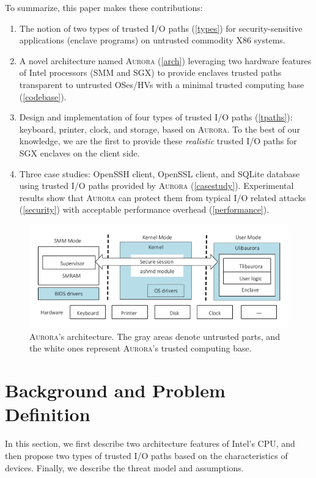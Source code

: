 To summarize, this paper makes these contributions:
\begin{enumerate}[]
\item The notion of two types of trusted I/O paths (\autoref{types}) for security-sensitive applications (enclave programs) on untrusted commodity X86 systems.
\item A novel architecture named \textsc{Aurora} (\autoref{arch}) leveraging two hardware features of Intel processors (SMM and SGX) to provide enclaves trusted paths transparent to untrusted OSes/HVs with a minimal trusted computing base (\autoref{codebase}).
\item Design and implementation of four types of trusted I/O paths (\autoref{tpaths}): keyboard, printer, clock, and storage, based on \textsc{Aurora}.  To the best of our knowledge, we are the first to provide these \emph{realistic} trusted I/O paths for SGX enclaves on the client side.
\item Three case studies: OpenSSH client, OpenSSL client, and SQLite database using trusted I/O paths provided by \textsc{Aurora} (\autoref{casestudy}). Experimental results show that \textsc{Aurora} can protect them from typical I/O related attacks (\autoref{security}) with acceptable performance overhead (\autoref{performance}).
\end{enumerate}

\begin{figure}[t]
	\centering
	\includegraphics[height=0.18\textheight]{figures/arch.pdf}
	\caption{\textsc{Aurora}'s architecture. The gray areas denote untrusted parts, and the white ones represent \textsc{Aurora}'s trusted computing base.}
	\label{fig:architecture}
\end{figure}

\section{Background and Problem Definition}
In this section, we first describe two architecture features of Intel's CPU, and then propose two types of trusted I/O paths based on the characteristics of devices. Finally, we describe the threat model and assumptions.

